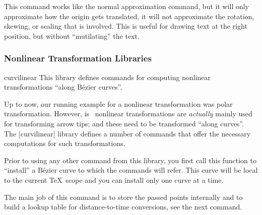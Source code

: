 \begin{command}{\pgfapproximatenonlineartranslation}
    This command works like the normal approximation command, but it will only
    approximate how the origin gets translated, it will not approximate the
    rotation, skewing, or scaling that is involved. This is useful for drawing
    text at the right position, but without ``mutilating'' the text.
\begin{codeexample}[]
\end{codeexample}
\end{command}


\subsubsection{Nonlinear Transformation Libraries}
\label{section-library-curvilinear}

\begin{pgflibrary}{curvilinear}
    This library defines commands for computing nonlinear transformations
    ``along Bézier curves''.
\end{pgflibrary}

Up to now, our running example for a nonlinear transformation was polar
transformation. However, is \pgfname\ nonlinear transformations are
\emph{actually} mainly used for transforming arrow tips; and these need to be
transformed ``along curves''. The |curvilinear| library defines a number of
commands that offer the necessary computations for such transformations.

\begin{command}{\pgfsetcurvilinearbeziercurve{}}
    Prior to using any other command from this library, you first call this
    function to ``install'' a Bézier curve to which the commands will refer.
    This curve will be local to the current \TeX\ scope and you can install
    only one curve at a time.

    The main job of this command is to store the passed points internally and
    to build a lookup table for distance-to-time conversions, see the next
    command.
\begin{codeexample}
\pgfsetcurvilinearbeziercurve
  {\pgfpointorigin}
  {\pgfpoint{1cm}{1cm}}
  {\pgfpoint{2cm}{1cm}}
  {\pgfpoint{3cm}{0cm}}
\end{codeexample}
\end{command}

